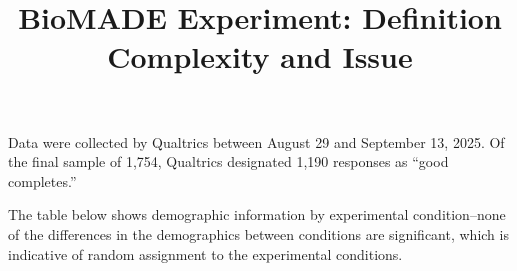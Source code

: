 \documentclass[
]{article}
\title{BioMADE Experiment: Definition Complexity and Issue}
\author{}
\date{}
\begin{document}
\maketitle
{}

\ifdefined\Shaded\renewenvironment{Shaded}{\begin{tcolorbox}[boxrule=0pt, interior hidden, borderline west={3pt}{0pt}{shadecolor}, enhanced, breakable, frame hidden, sharp corners]}{\end{tcolorbox}}\fi

Data were collected by Qualtrics between August 29 and September 13,
2025. Of the final sample of 1,754, Qualtrics designated 1,190 responses
as ``good completes.''

The table below shows demographic information by experimental
condition--none of the differences in the demographics between
conditions are significant, which is indicative of random assignment to
the experimental conditions.
\end{document}
